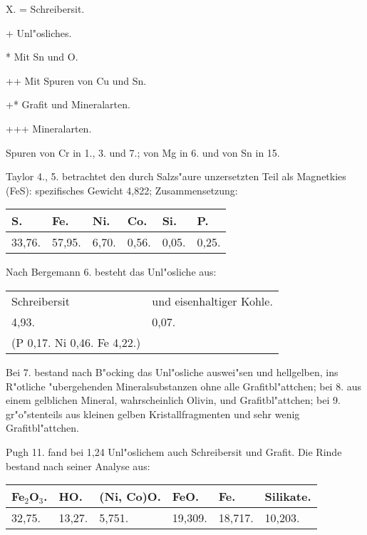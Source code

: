\documentclass[a4paper, 11pt, oneside]{article}
\begin{document}
X. = Schreibersit.

+ Unl"osliches.

* Mit Sn und O.

++ Mit Spuren von Cu und Sn.

+* Grafit und Mineralarten.

+++ Mineralarten.

Spuren von Cr in 1., 3. und 7.; von Mg in 6. und von Sn in 15.

Taylor 4., 5. betrachtet den durch Salzs"aure unzersetzten Teil als Magnetkies (FeS): spezifisches Gewicht 4,822; Zusammensetzung:
\begin{table}[H]
    \centering\swabfamily\Large
    \begin{tabular}{l l l l l l}
        S. & Fe. & Ni. & Co. & Si. & P. \\ \hline
        33,76. & 57,95. & 6,70. & 0,56. & 0,05. & 0,25. \\
    \end{tabular}
\end{table}

Nach Bergemann 6. besteht das Unl"osliche aus:
\begin{table}[H]
    \centering\swabfamily\Large
    \begin{tabular}{l l}
        Schreibersit & und eisenhaltiger Kohle. \\
        4,93. & 0,07. \\
        (P 0,17. Ni 0,46. Fe 4,22.) & \\
    \end{tabular}
\end{table}

Bei 7. bestand nach B"ocking das Unl"osliche auswei"sen und hellgelben, ins R"otliche "ubergehenden Mineralsubstanzen ohne alle Grafitbl"attchen; bei 8. aus einem gelblichen Mineral, wahrscheinlich Olivin, und Grafitbl"attchen; bei 9. gr"o"stenteils aus kleinen gelben Kristallfragmenten und sehr wenig Grafitbl"attchen.

Pugh 11. fand bei 1,24 Unl"oslichem auch Schreibersit und Grafit. Die Rinde bestand nach seiner Analyse aus:
\begin{table}[H]
    \centering\swabfamily\Large
    \begin{tabular}{l l l l l l}
        Fe$_{2}$O$_{3}$. & HO. & (Ni, Co)O. & FeO. & Fe. & Silikate. \\ \hline
        32,75. & 13,27. & 5,751. & 19,309. & 18,717. & 10,203. \\
    \end{tabular}
\end{table}
\end{document}

